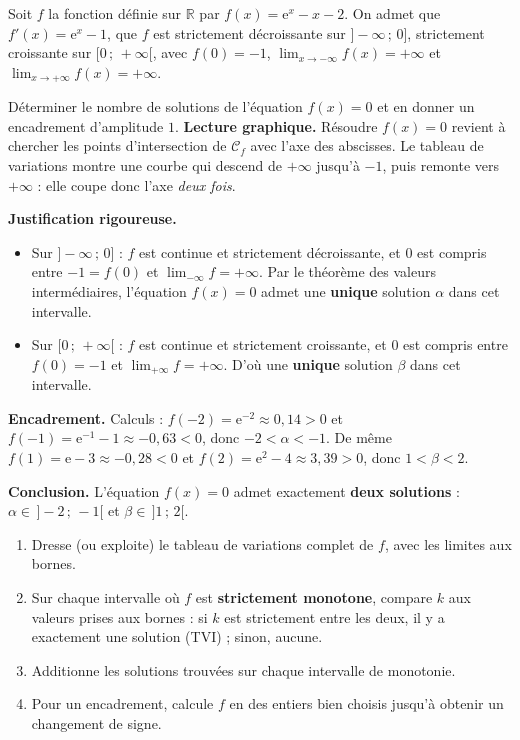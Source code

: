\documentclass[11pt]{article}
\begin{document}
\begin{exoresolu}
Soit $f$ la fonction définie sur $\mathbb{R}$ par $f(x) = \mathrm{e}^{x} - x - 2$. On admet que $f'(x) = \mathrm{e}^x - 1$, que $f$ est strictement décroissante sur $]-\infty\,;\,0]$, strictement croissante sur $[0\,;\,+\infty[$, avec $f(0) = -1$, $\displaystyle\lim_{x\to-\infty} f(x) = +\infty$ et $\displaystyle\lim_{x\to+\infty} f(x) = +\infty$.
\par
Déterminer le nombre de solutions de l'équation $f(x) = 0$ et en donner un encadrement d'amplitude $1$.
\tcblower
\textbf{Lecture graphique.} Résoudre $f(x) = 0$ revient à chercher les points d'intersection de $\mathcal{C}_f$ avec l'axe des abscisses. Le tableau de variations montre une courbe qui descend de $+\infty$ jusqu'à $-1$, puis remonte vers $+\infty$ : elle coupe donc l'axe \emph{deux fois}.
\par\smallskip
\textbf{Justification rigoureuse.}
\begin{itemize}
\item Sur $]-\infty\,;\,0]$ : $f$ est continue et strictement décroissante, et $0$ est compris entre $-1 = f(0)$ et $\displaystyle\lim_{-\infty} f = +\infty$. Par le théorème des valeurs intermédiaires, l'équation $f(x)=0$ admet une \textbf{unique} solution $\alpha$ dans cet intervalle.
\item Sur $[0\,;\,+\infty[$ : $f$ est continue et strictement croissante, et $0$ est compris entre $f(0) = -1$ et $\displaystyle\lim_{+\infty} f = +\infty$. D'où une \textbf{unique} solution $\beta$ dans cet intervalle.
\end{itemize}
\textbf{Encadrement.} Calculs : $f(-2) = \mathrm{e}^{-2} \approx 0{,}14 > 0$ et $f(-1) = \mathrm{e}^{-1} - 1 \approx -0{,}63 < 0$, donc $-2 < \alpha < -1$. De même $f(1) = \mathrm{e} - 3 \approx -0{,}28 < 0$ et $f(2) = \mathrm{e}^2 - 4 \approx 3{,}39 > 0$, donc $1 < \beta < 2$.
\par\smallskip
\textbf{Conclusion.} L'équation $f(x) = 0$ admet exactement \textbf{deux solutions} : $\alpha \in\, ]-2\,;\,-1[$ et $\beta \in\, ]1\,;\,2[$.
\end{exoresolu}

\begin{methode}[Dénombrer les solutions de $f(x) = k$ à partir du tableau de variations]
\begin{enumerate}
\item Dresse (ou exploite) le tableau de variations complet de $f$, avec les limites aux bornes.
\item Sur chaque intervalle où $f$ est \textbf{strictement monotone}, compare $k$ aux valeurs prises aux bornes : si $k$ est strictement entre les deux, il y a exactement une solution (TVI) ; sinon, aucune.
\item Additionne les solutions trouvées sur chaque intervalle de monotonie.
\item Pour un encadrement, calcule $f$ en des entiers bien choisis jusqu'à obtenir un changement de signe.
\end{enumerate}
\end{methode}
\end{document}
